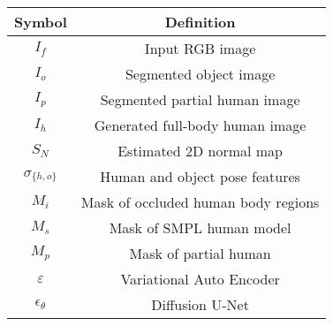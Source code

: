 \begin{tabular}{c|c}
\textbf{Symbol}                         & \textbf{Definition}                                                                                                                     \\ \hline
$I_f$                                   & Input RGB image                                                                                                                         \\ \hline
$I_o$                                   & Segmented object image                                                                                                                  \\ \hline
$I_p$                                   & Segmented partial human image                                                                                                           \\ \hline
$I_h$                                   & Generated full-body human image                                                                                                         \\ \hline
$S_N$                                   & Estimated 2D normal map                                                                                                                 \\ \hline
$\sigma_{\{h,o\}}$    & Human and object pose features                                                                                                          \\ \hline
$M_i$                                   & Mask of occluded human body regions                                                                                                     \\ \hline
$M_s$                                   & Mask of SMPL human model                                                                                                                \\ \hline
$M_p$                                   & Mask of partial human                                                                                                                   \\ \hline
$\varepsilon$                           & Variational Auto Encoder                                                                                                                \\ \hline
$\epsilon_{\theta}$                     & Diffusion U-Net                                                                                                                         \\ \hline

\end{tabular}
